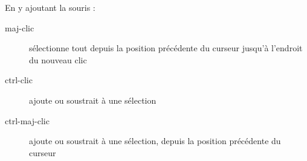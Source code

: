\documentclass[10pt,a4paper]{report}
\begin{document}
En y ajoutant la souris :
\begin{description}
	\item[maj-clic] sélectionne tout depuis la position précédente du curseur jusqu'à l'endroit du nouveau clic
	\item[ctrl-clic] ajoute ou soustrait à une sélection
	\item[ctrl-maj-clic] ajoute ou soustrait à une sélection, depuis la position précédente du curseur
\end{description}




\newpage





\nocite{CreusetsNet,ENTEnvironnementNumerique,MoodleLCC}
\printbibliography[title=Notes bibliographiques,heading=subbibnumbered]
\end{document}
